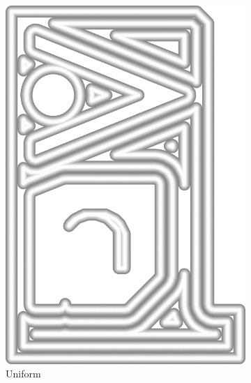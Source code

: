 \begin{figure}
\begin{subfigure}{\figwidth}
\includegraphics[height=\figheight]{sources/validation/gMAT_example/TEST_naive_widths.png}
\caption{Uniform}\label{TEST_naive_accuracy}
\end{subfigure}
\begin{subfigure}{\figwidth}\centering

\end{subfigure}
\end{figure}
